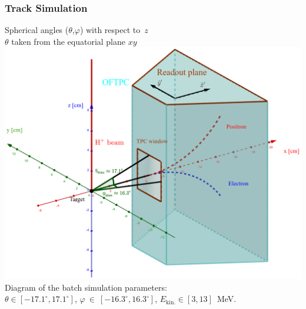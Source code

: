 \documentclass{beamer}
\begin{document}
	\begin{frame}
		\frametitle{Track Simulation}
		\centering
		\large{Spherical angles ($\theta$,$\varphi$) with respect to~$z$}\\
		\small{$\theta$ taken from the equatorial plane $xy$}
		\centering
		\textcolor{white}{aaaaaaaa}\includegraphics[height= 0.61 \textheight]{../images/tpc_micro_simulation.png}\newline
		\small{Diagram of the batch simulation parameters:\\ $\theta\in[-17.1^\circ,17.1^\circ]$, $\varphi~\in~[-16.3^\circ,16.3^\circ]$, $ E_\text{kin.} \in [3,13] $~MeV.}
	\end{frame}
	
\end{document}
